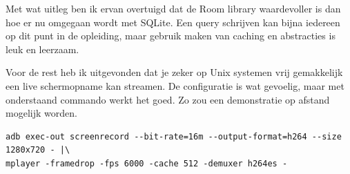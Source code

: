 \documentclass[dutch]{report}
\begin{document}
	Met wat uitleg ben ik ervan overtuigd dat de Room library waardevoller is dan hoe er nu omgegaan wordt met SQLite. Een query schrijven
	kan bijna iedereen op dit punt in de opleiding, maar gebruik maken van caching en abstracties is leuk en leerzaam. 
	
	Voor de rest heb ik uitgevonden dat je zeker op Unix systemen vrij gemakkelijk een live schermopname kan streamen. De configuratie is
	wat gevoelig, maar met onderstaand commando werkt het goed. Zo zou een demonstratie op afstand mogelijk worden. 

	\begin{lstlisting}
adb exec-out screenrecord --bit-rate=16m --output-format=h264 --size 1280x720 - |\
mplayer -framedrop -fps 6000 -cache 512 -demuxer h264es -
	\end{lstlisting}
\end{document}
